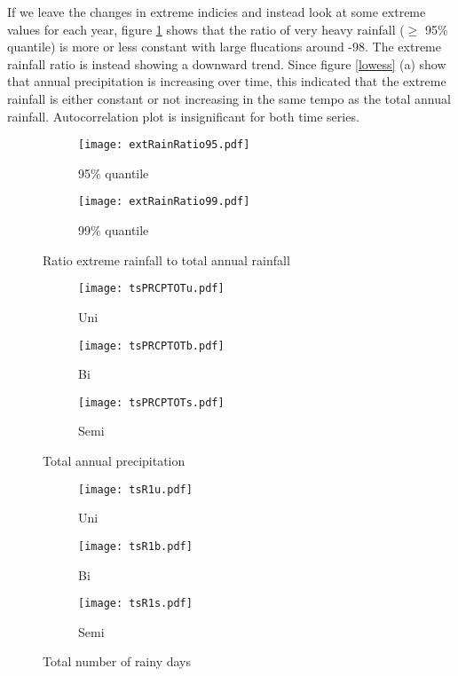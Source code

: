 \documentclass{article}
\begin{document}
	If we leave the changes in extreme indicies and instead look at some extreme values for each year, figure \ref{extRainRatio} shows that the ratio of very heavy rainfall ($\geq$ 95\% quantile) is more or less constant with large flucations around -98. The extreme rainfall ratio is instead showing a downward trend. Since figure \ref{lowess} (a) show that annual precipitation is increasing over time, this indicated that the extreme rainfall is either constant or not increasing in the same tempo as the total annual rainfall. Autocorrelation plot is insignificant for both time series. 
	\begin{figure}[H]
		\centering
		\begin{subfigure}{0.5\textwidth}
			\centering
			\texttt{[image: extRainRatio95.pdf]}
			\caption{95\% quantile}
		\end{subfigure}%
		\begin{subfigure}{0.5\textwidth}
			\centering
			\texttt{[image: extRainRatio99.pdf]}
			\caption{99\% quantile}
		\end{subfigure}	
		\caption{Ratio extreme rainfall to total annual rainfall}
		\label{extRainRatio}
	\end{figure}

	\begin{figure}[H]
		\centering
		\begin{subfigure}{0.3\textwidth}
			\centering
			\texttt{[image: tsPRCPTOTu.pdf]}
			\caption{Uni}
		\end{subfigure}%
		\begin{subfigure}{0.3\textwidth}
			\centering
			\texttt{[image: tsPRCPTOTb.pdf]}
			\caption{Bi}
		\end{subfigure}%
		\begin{subfigure}{0.3\textwidth}
			\centering
			\texttt{[image: tsPRCPTOTs.pdf]}
			\caption{Semi}
		\end{subfigure}
		\caption{Total annual precipitation}
		\label{modesPRCPTOT}
	\end{figure}

		\begin{figure}[H]
		\centering
		\begin{subfigure}{0.3\textwidth}
			\centering
			\texttt{[image: tsR1u.pdf]}
			\caption{Uni}
		\end{subfigure}%
		\begin{subfigure}{0.3\textwidth}
			\centering
			\texttt{[image: tsR1b.pdf]}
			\caption{Bi}
		\end{subfigure}%
		\begin{subfigure}{0.3\textwidth}
			\centering
			\texttt{[image: tsR1s.pdf]}
			\caption{Semi}
		\end{subfigure}
		\caption{Total number of rainy days}
		\label{modesR1}
	\end{figure}
	
\end{document}
